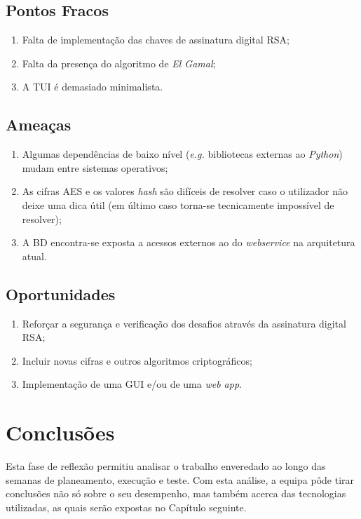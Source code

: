\subsection{Pontos Fracos}
\label{chap4:subsec:pontosfracos}

\begin{enumerate}[nosep]
    \item Falta de implementação das chaves de assinatura digital \ac{RSA};
    \item Falta da presença do algoritmo de \textit{El Gamal};
    \item A \acf{TUI} é demasiado minimalista.
\end{enumerate}


\subsection{Ameaças}
\label{chap4:subsec:ameacas}

\begin{enumerate}[nosep]
    \item Algumas dependências de baixo nível (\textit{e.g.} bibliotecas externas ao \textit{Python}) mudam entre sistemas operativos;
    \item As cifras \ac{AES} e os valores \textit{hash} são difíceis de resolver caso o utilizador não deixe uma dica útil (em último caso torna-se tecnicamente impossível de resolver);
    \item A \ac{BD} encontra-se exposta a acessos externos ao do \textit{webservice} na arquitetura atual.
\end{enumerate}



\subsection{Oportunidades}
\label{chap4:subsec:oportunidades}

\begin{enumerate}[nosep]
    \item Reforçar a segurança e verificação dos desafios através da assinatura digital \ac{RSA};
    \item Incluir novas cifras e outros algoritmos criptográficos;
    \item Implementação de uma \ac{GUI} e/ou de uma \textit{web app}.
\end{enumerate}



\section{Conclusões}
\label{chap4:sec:concs}

Esta fase de reflexão permitiu analisar o trabalho enveredado ao longo das semanas de planeamento, execução e teste. Com esta análise, a equipa pôde tirar conclusões não só sobre o seu desempenho, mas também acerca das tecnologias utilizadas, as quais serão expostas no Capítulo seguinte.
